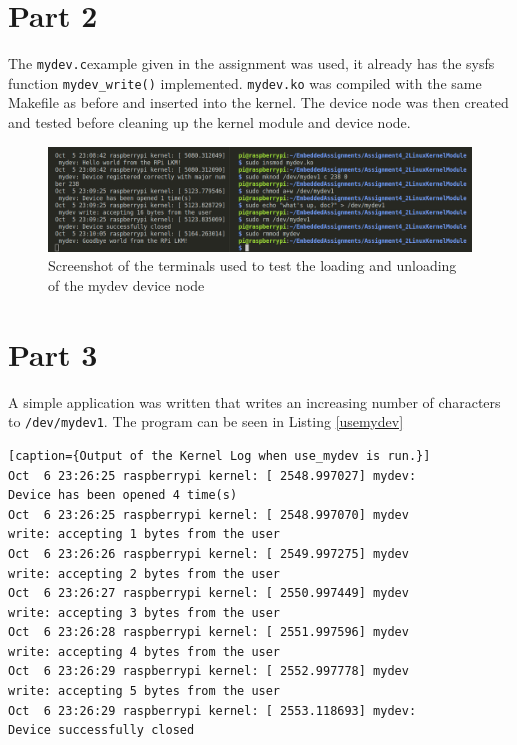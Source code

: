 \documentclass{article}
\begin{document}
\newpage
\section*{Part 2}
The \verb"mydev.c"example given in the assignment was used, it already has the sysfs function \verb!mydev_write()! implemented. \verb!mydev.ko! was compiled with the same Makefile as before and inserted into the kernel. The device node was then created and tested before cleaning up the kernel module and device node.

\begin{figure}[h]
    \centering
    \includegraphics[width=\textwidth]{Assignment4_2LinuxKernelModule/part2_device.png}
    \caption{Screenshot of the terminals used to test the loading and unloading of the mydev device node}
    \label{fig:kernel_loading}
\end{figure}

\section*{Part 3}
A simple application was written that writes an increasing number of characters to \verb!/dev/mydev1!. The program can be seen in Listing \ref{usemydev}

\label{usemydev}

\begin{verbatim}[caption={Output of the Kernel Log when use_mydev is run.}]
Oct  6 23:26:25 raspberrypi kernel: [ 2548.997027] mydev:
Device has been opened 4 time(s)
Oct  6 23:26:25 raspberrypi kernel: [ 2548.997070] mydev
write: accepting 1 bytes from the user
Oct  6 23:26:26 raspberrypi kernel: [ 2549.997275] mydev 
write: accepting 2 bytes from the user
Oct  6 23:26:27 raspberrypi kernel: [ 2550.997449] mydev 
write: accepting 3 bytes from the user
Oct  6 23:26:28 raspberrypi kernel: [ 2551.997596] mydev 
write: accepting 4 bytes from the user
Oct  6 23:26:29 raspberrypi kernel: [ 2552.997778] mydev 
write: accepting 5 bytes from the user
Oct  6 23:26:29 raspberrypi kernel: [ 2553.118693] mydev: 
Device successfully closed
\end{verbatim}
\end{document}
